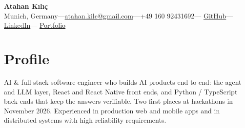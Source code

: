 \documentclass[10pt,a4paper]{article}
\newcommand{\sep}{\enspace---\enspace}
\begin{document}
\begin{center}
  {\LARGE\bfseries Atahan Kılıç}\\[3pt]
  Munich, Germany\sep\href{mailto:atahan.kilc@gmail.com}{atahan.kilc@gmail.com}\sep+49 160 92431692\sep
  \href{https://github.com/atahankilc}{GitHub}\sep\href{https://www.linkedin.com/in/atahan-kilic}{LinkedIn}\sep
  \href{https://atahankilc.github.io}{Portfolio}
\end{center}

\section{Profile}
AI \& full-stack software engineer who builds AI products end to end: the agent and LLM layer, React and React Native
front ends, and Python / TypeScript back ends that keep the answers verifiable. Two first places at hackathons in
November 2026. Experienced in production web and mobile apps and in distributed systems with high reliability
requirements.
\end{document}
